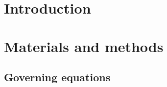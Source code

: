 \documentclass[a4paper,fleqn]{cas-dc}
\begin{document}

\section{Introduction}
%





\section{Materials and methods} \label{CH: Materials and methods}

%
%

%

%

\subsection{Governing equations} \label{CH:Governing_equations_chapter}
\end{document}
